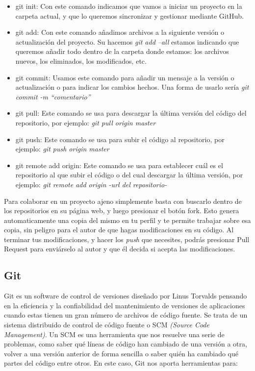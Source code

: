 \begin{itemize}
	\item git init: Con este comando indicamos que vamos a iniciar un proyecto en la carpeta actual, y que lo queremos sincronizar y gestionar mediante GitHub.
	\item git add: Con este comando añadimos archivos a la siguiente versión o actualización del proyecto. Su hacemos \textit{git add --all} estamos indicando que queremos añadir todo dentro de la carpeta donde estamos: los archivos nuevos, los eliminados, los modificados, etc.
	\item git commit: Usamos este comando para añadir un mensaje a la versión o actualización o para indicar los cambios hechos. Una forma de usarlo sería \textit{git commit -m “comentario”}
	\item git pull: Este comando se usa para descargar la última versión del código del repositorio, por ejemplo: \textit{git pull origin master}
	\item git push: Este comando se usa para subir el código al repositorio, por ejemplo: \textit{git push origin master}
	\item git remote add origin: Este comando se usa para establecer cuál es el repositorio al que subir el código o del cual descargar la última versión, por ejemplo: \textit{git remote add origin -url del repositorio-}
\end{itemize}

Para colaborar en un proyecto ajeno simplemente basta con buscarlo dentro de los repositorios en su página web, y luego presionar el botón fork. Esto genera automaticamente una copia del mismo en tu perfil y te permite trabajar sobre esa copia, sin peligro para el autor de que hagas modificaciones en su código. Al terminar tus modificaciones, y hacer los \textit{push} que necesites, podrás presionar Pull Request para enviárselo al autor y que él decida si acepta las modificaciones.

\subsection{Git}
\label{subsec:plat_git}

Git\cite{git} es un software de control de versiones diseñado por Linus Torvalds pensando en la eficiencia y la confiabilidad del mantenimiento de versiones de aplicaciones cuando estas tienen un gran número de archivos de código fuente. Se trata de un sistema distribuido de control de código fuente o SCM \textit{(Source Code Management)}. Un SCM es una herramienta que nos resuelve una serie de problemas, como saber qué líneas de código han cambiado de una versión a otra, volver a una versión anterior de forma sencilla o saber quién ha cambiado qué partes del código entre otros. En este caso, Git nos aporta herramientas para:

